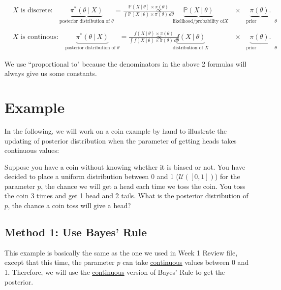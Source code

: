\documentclass{article}
\def\dsst{\displaystyle}
\begin{document}
\begin{align*}
& \text{$X$ is discrete:} \quad \underbrace{\pi^*(\theta~|~X)}_\text{posterior distribution of $\theta$}  =  \frac{\mathbb{P}(X~|~\theta)\times \pi(\theta)}{\dsst \int \mathbb{P}(X~|~\theta)\times \pi(\theta)\, d\theta} & \propto & & \underbrace{\mathbb{P}(X~|~\theta)}_\text{likelihood/probability of $X$} & & \times & \underbrace{\pi(\theta).}_\text{prior distribution of $\theta$} &\\
&&& \\
& \text{$X$ is continous:}  \quad \underbrace{\pi^*(\theta~|~X) }_\text{posterior distribution of $\theta$} = \frac{f(X~|~\theta)\times \pi(\theta)}{\dsst \int f(X~|~\theta)\times \pi(\theta)\, d\theta}& \propto & & \underbrace{f(X~|~\theta)}_\text{distribution of $X$} & & \times & \underbrace{\pi(\theta).}_\text{prior distribution of $\theta$} &
\end{align*}

We use ``proportional to" because the denominators in the above 2 formulas will always give us some constants.

\section{Example}

In the following, we will work on a coin example by hand to illustrate the updating of posterior distribution when the parameter of getting heads takes continuous values:
\begin{displayquote}
	Suppose you have a coin without knowing whether it is biased or not. You have decided to place a uniform distribution between 0 and 1 ($\mathcal{U}([0,1])$) for the parameter $p$, the chance we will get a head each time we toss the coin. You toss the coin 3 times and get 1 head and 2 tails. What is the posterior distribution of $p$, the chance a coin toss will give a head?
\end{displayquote}

\subsection{Method 1: Use Bayes' Rule}

This example is basically the same as the one we used in Week 1 Review file, except that this time, the parameter $p$ can take \underline{continuous} values between 0 and 1. Therefore, we will use the \underline{continuous} version of Bayes' Rule to get the posterior. \\
\end{document}
